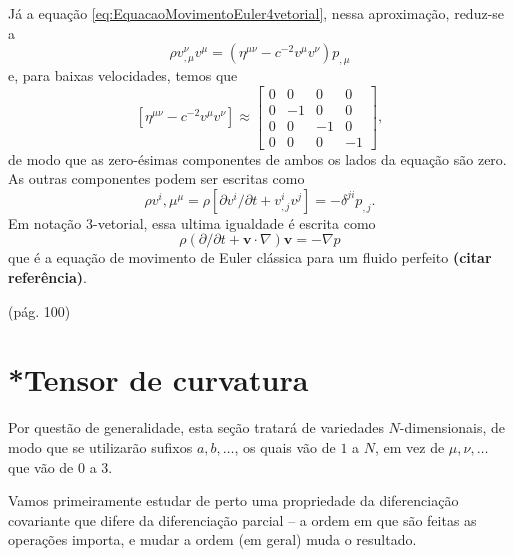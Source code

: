 Já a equação \ref{eq:EquacaoMovimentoEuler4vetorial}, nessa aproximação, reduz-se a 
\[
	\rho v_{, \mu}^{\nu} v^{\mu}=\left(\eta^{\mu \nu}-c^{-2} v^{\mu} v^{\nu}\right) p_{, \mu}
\]
e, para baixas velocidades, temos que
\[
\left[\eta^{\mu \nu}-c^{-2} v^{\mu} v^{\nu}\right] \approx
\left[\begin{array}{rrrr}{0} & {0} & {0} & {0} \\ {0} & {-1} & {0} & {0} \\ {0} & {0} & {-1} & {0} \\ {0} & {0} & {0} & {-1}\end{array}\right],
\]
de modo que as zero-ésimas componentes de ambos os lados da equação são zero. As outras componentes podem ser escritas como
\[
	\rho v^{i}, \mu^{\mu}= \rho\left[\partial v^{i} / \partial t+v_{, j}^{i} v^{j}\right]=-\delta^{j i} p_{, j} .\]
Em notação 3-vetorial, essa ultima igualdade é escrita como
\begin{equation}\label{eq:EquacaoMovimentoEulerClassica3vetorial}
	\boxed{
		\rho(\partial / \partial t+\mathbf{v} \cdot \nabla) \mathbf{v}=-\nabla p
	}
\end{equation}
que é a equação de movimento de Euler clássica para um fluido perfeito \textbf{(citar referência)}.

(pág. 100)




















\section{*Tensor de curvatura}\label{sec:TensorCurvatura}

Por questão de generalidade, esta seção tratará de variedades $N$-dimensionais, de modo que se utilizarão sufixos $a,b,\dots$, os quais vão de $1$ a $N$, em vez de $\mu,\nu,\dots$ que vão de $0$ a $3$. 

Vamos primeiramente estudar de perto uma propriedade da diferenciação covariante que difere da diferenciação parcial -- a ordem em que são feitas as operações importa, e mudar a ordem (em geral) muda o resultado.

